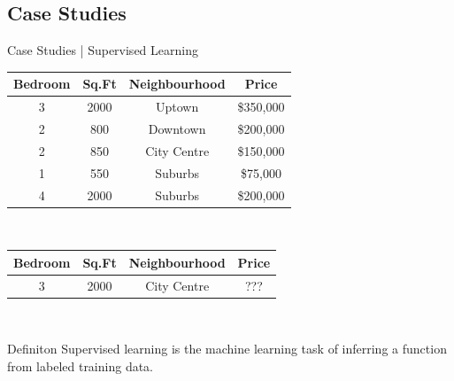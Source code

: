\documentclass[10pt]{beamer}
\begin{document}
		\subsection{Case Studies}
			\begin{frame}{Case Studies | Supervised Learning}
				\begin{center}
					\begin{tabular}{|c|c|c|c|}							\hline 
						\bfseries{Bedroom} & \bfseries{Sq.Ft} & \bfseries{Neighbourhood} & \bfseries{Price}\\ 	\hline
						3       & 2000  & Uptown        & \$350,000 \\ 	\hline 
						2       & 800   & Downtown      & \$200,000 \\ 	\hline 
						2       & 850   & City Centre   & \$150,000 \\ 	\hline 
						1       & 550   & Suburbs       & \$75,000 \\	\hline 
						4       & 2000  & Suburbs       & \$200,000 \\	\hline 
					\end{tabular}\\
					\bigskip
					\begin{tabular}{|c|c|c|c|}							\hline 
						\bfseries{Bedroom} & \bfseries{Sq.Ft} & \bfseries{Neighbourhood} & \bfseries{Price}\\ 	\hline
						3   	& 2000  & City Centre   & ???\\			\hline 
					\end{tabular} \\
					\bigskip
					\begin{block}{Definiton}
						Supervised learning is the machine learning task of inferring a function from labeled training data.
					\end{block}
				\end{center} 
			\end{frame}
\end{document}
